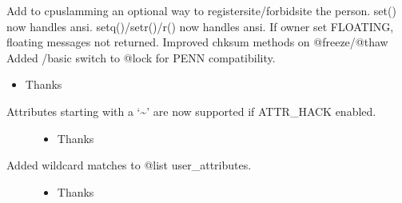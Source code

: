 \documentclass[letterpaper,10pt,english]{sphinxmanual}
\begin{document}
\sphinxAtStartPar
Add to cpu\sphinxhyphen{}slamming an optional way to register\sphinxhyphen{}site/forbid\sphinxhyphen{}site the person.
set() now handles ansi.
setq()/setr()/r() now handles ansi.
If owner set FLOATING, floating messages not returned.
Improved chksum methods on @freeze/@thaw
Added /basic switch to @lock for PENN compatibility.
\begin{itemize}
\item {} 
\sphinxAtStartPar
Thanks 

\end{itemize}
\begin{description}
\item[{Attributes starting with a ‘\textasciitilde{}’ are now supported if ATTR\_HACK enabled.}] \leavevmode\begin{itemize}
\item {} 
\sphinxAtStartPar
Thanks 

\end{itemize}

\item[{Added wildcard matches to @list user\_attributes.}] \leavevmode\begin{itemize}
\item {} 
\sphinxAtStartPar
Thanks 

\end{itemize}

\end{description}
\end{document}
